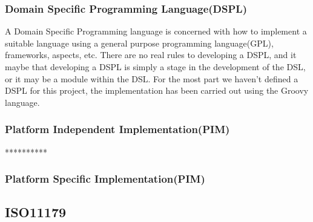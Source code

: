 \documentclass{llncs}
\begin{document}
\subsubsection{Domain Specific Programming Language(DSPL)}	
A Domain Specific Programming language is concerned with how to implement a suitable language using a general purpose programming language(GPL), frameworks, aspects, etc. There are no real rules to developing a DSPL, and it maybe that developing a DSPL is simply a stage in the development of the DSL, or it may be a module within the DSL. For the most part we haven't defined a DSPL for this project, the implementation has been carried out using the Groovy language. 

\subsubsection{Platform Independent Implementation(PIM)}

**********
\subsubsection{Platform Specific Implementation(PIM)}

\subsection{ISO11179}
\end{document}
